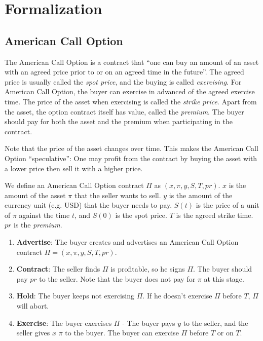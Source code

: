 \section{Formalization}
\label{sec:formalization}

\subsection{American Call Option}

The American Call Option is a contract that ``one can buy an amount of an asset with an agreed price prior to or on an agreed time in the future''.
The agreed price is usually called the \textit{spot price}, and the buying is called \textit{exercising}.
For American Call Option, the buyer can exercise in advanced of the agreed exercise time.
The price of the asset when exercising is called the \textit{strike price}.
Apart from the asset, the option contract itself has value, called the \textit{premium}.
The buyer should pay for both the asset and the premium when participating in the contract.

Note that the price of the asset changes over time. This makes the American Call Option ``speculative'': One may profit from the contract by buying the asset with a lower price then sell it with a higher price.

We define an American Call Option contract $\Pi$ as $(x, \pi, y, S, T, pr)$.
$x$ is the amount of the asset $\pi$ that the seller wants to sell.
$y$ is the amount of the currency unit (e.g. USD) that the buyer needs to pay.
$S(t)$ is the price of a unit of $\pi$ against the time $t$, and $S(0)$ is the spot price.
$T$ is the agreed strike time.
$pr$ is the \textit{premium}.


\begin{enumerate}
    \item \textbf{Advertise}: The buyer creates and advertises an American Call Option contract $\Pi = (x, \pi, y, S, T, pr)$.
    \item \textbf{Contract}: The seller finds $\Pi$ is profitable, so he signs $\Pi$. The buyer should pay $pr$ to the seller. Note that the buyer does not pay for $\pi$ at this stage.
    \item \textbf{Hold}: The buyer keeps not exercising $\Pi$. If he doesn't exercise $\Pi$ before $T$, $\Pi$ will abort.
    \item \textbf{Exercise}: The buyer exercises $\Pi$ - The buyer pays $y$ to the seller, and the seller gives $x$ $\pi$ to the buyer. The buyer can exercise $\Pi$ before $T$ or on $T$.
\end{enumerate}

